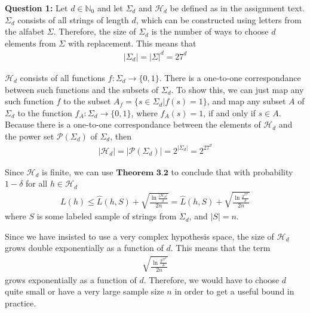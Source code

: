 \textbf{Question 1:} Let $d\in \mathbb{N}_0$ and let $\Sigma_d$ and $\mathcal{H}_d$ be defined as in the assignment text. $\Sigma_d$ consists of all strings of length $d$, which can be constructed using letters from the alfabet $\Sigma$. Therefore, the size of $\Sigma_d$ is the number of ways to choose $d$ elements from $\Sigma$ with replacement. This means that 
\begin{align}
|\Sigma_d| = |\Sigma|^d = 27^d 
\end{align}

$\mathcal{H}_d$ consists of all functions $f: \Sigma_d \to \{0,1\}$. There is a one-to-one correspondance between such functions and the subsets of $\Sigma_d$. To show this, we can just map any such function $f$ to the subset $A_f = \{ s \in \Sigma_d | f(s) = 1 \}$, and map any subset $A$ of $\Sigma_d$ to the function $f_A: \Sigma_d \to \{0,1\}$, where $f_A(s)=1$, if and only if $s\in A$. Because there is a one-to-one correspondance between the elements of $\mathcal{H}_d$ and the power set $\mathcal{P}(\Sigma_d)$ of $\Sigma_d$, then
\begin{align}
|\mathcal{H}_d| = |\mathcal{P}(\Sigma_d)| = 2^{|\Sigma_d|}=2^{27^d}
\end{align}

Since $\mathcal{H}_d$ is finite, we can use $\textbf{Theorem 3.2}$ to conclude that with probability $1 - \delta$ for all $h \in \mathcal{H}_d$
\begin{align}
L(h) \leq \hat{L}(h, S) + \sqrt{\frac{\ln \frac{|\mathcal{H}_d|}{\delta}}{2n}} = \hat{L}(h, S) + \sqrt{\frac{\ln \frac{2^{27^d}}{\delta}}{2n}}
\end{align}
where $S$ is some labeled sample of strings from $\Sigma_d$, and $|S|=n$. 

Since we have insisted to use a very complex hypothesis space, the size of $\mathcal{H}_d$ grows double exponentially as a function of $d$. This means that the term 
\begin{align}
\sqrt{\frac{\ln \frac{2^{27^d}}{\delta}}{2n}}
\end{align}
grows exponentially as a function of $d$. Therefore, we would have to choose $d$ quite small or have a very large sample size $n$ in order to get a useful bound in practice.

